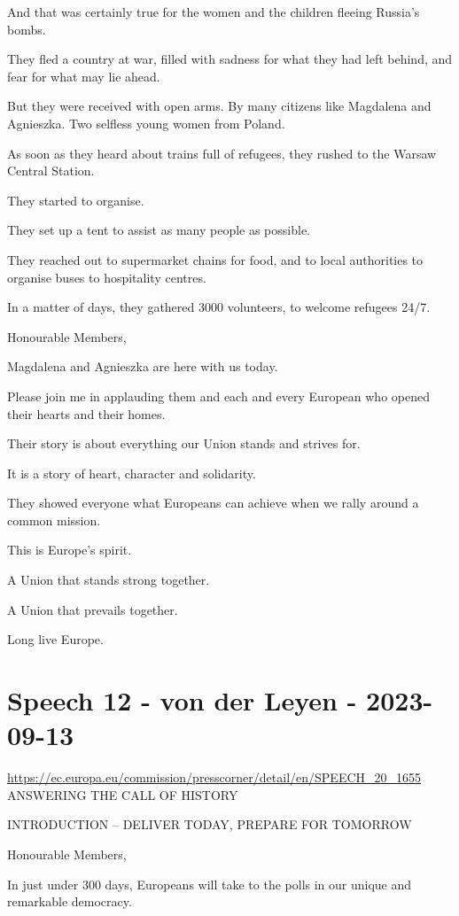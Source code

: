 \documentclass[a4paper,11pt]{article}
\begin{document}
And that was certainly true for the women and the children fleeing Russia's bombs.

They fled a country at war, filled with sadness for what they had left behind, and fear for what may lie ahead.

But they were received with open arms. By many citizens like Magdalena and Agnieszka. Two selfless young women from Poland.

As soon as they heard about trains full of refugees, they rushed to the Warsaw Central Station.

They started to organise.

They set up a tent to assist as many people as possible.

They reached out to supermarket chains for food, and to local authorities to organise buses to hospitality centres.

In a matter of days, they gathered 3000 volunteers, to welcome refugees 24/7.

 

Honourable Members,

Magdalena and Agnieszka are here with us today.

Please join me in applauding them and each and every European who opened their hearts and their homes.

Their story is about everything our Union stands and strives for.

It is a story of heart, character and solidarity.

They showed everyone what Europeans can achieve when we rally around a common mission.

This is Europe's spirit.

A Union that stands strong together.

A Union that prevails together.

Long live Europe.
 \newpage\section{Speech 12 - von der Leyen - 2023-09-13}
\url{https://ec.europa.eu/commission/presscorner/detail/en/SPEECH_20_1655}\\[3mm]
ANSWERING THE CALL OF HISTORY

 

INTRODUCTION – DELIVER TODAY, PREPARE FOR TOMORROW

Honourable Members,

In just under 300 days, Europeans will take to the polls in our unique and remarkable democracy.
\end{document}
